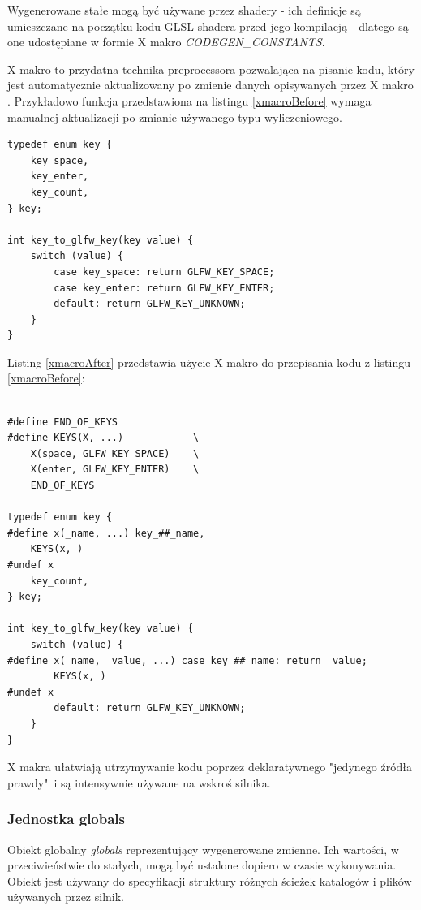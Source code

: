 Wygenerowane stałe mogą być używane przez shadery - ich definicje są umieszczane na początku kodu GLSL shadera przed jego kompilacją - dlatego są one udostępiane w formie X makro \textit{CODEGEN\_CONSTANTS}.

X makro to przydatna technika preprocessora pozwalająca na pisanie kodu, który jest automatycznie aktualizowany po zmienie danych opisywanych przez X makro \cite{XMACRO}.
Przykładowo funkcja przedstawiona na listingu \ref{xmacroBefore} wymaga manualnej aktualizacji po zmianie używanego typu wyliczeniowego.
\lstset{language=C}
\begin{lstlisting}[caption={Przykładowy kod przed zastosowaniem X makro},captionpos=b,label={xmacroBefore}]
typedef enum key {
	key_space,
	key_enter,
	key_count,
} key;

int key_to_glfw_key(key value) {
	switch (value) {
		case key_space: return GLFW_KEY_SPACE;
		case key_enter: return GLFW_KEY_ENTER;
		default: return GLFW_KEY_UNKNOWN;
	}
}
\end{lstlisting}
Listing \ref{xmacroAfter} przedstawia użycie X makro do przepisania kodu z listingu \ref{xmacroBefore}:
\lstset{language=C}
\begin{lstlisting}[caption={Przykładowy kod po zastosowaniu X makro},captionpos=b,label={xmacroAfter}]

#define END_OF_KEYS
#define KEYS(X, ...)			\
	X(space, GLFW_KEY_SPACE)	\
	X(enter, GLFW_KEY_ENTER)	\
	END_OF_KEYS

typedef enum key {
#define x(_name, ...) key_##_name,
	KEYS(x, )
#undef x
	key_count,
} key;

int key_to_glfw_key(key value) {
	switch (value) {
#define x(_name, _value, ...) case key_##_name: return _value;
		KEYS(x, )
#undef x
		default: return GLFW_KEY_UNKNOWN;
	}
}
\end{lstlisting}
X makra ułatwiają utrzymywanie kodu poprzez deklaratywnego "jedynego źródła prawdy"\  i są intensywnie używane na wskroś silnika.

\subsubsection{Jednostka globals}
Obiekt globalny \textit{globals} reprezentujący wygenerowane zmienne.
Ich wartości, w przeciwieństwie do stałych, mogą być ustalone dopiero w czasie wykonywania.
Obiekt jest używany do specyfikacji struktury różnych ścieżek katalogów i plików używanych przez silnik.

